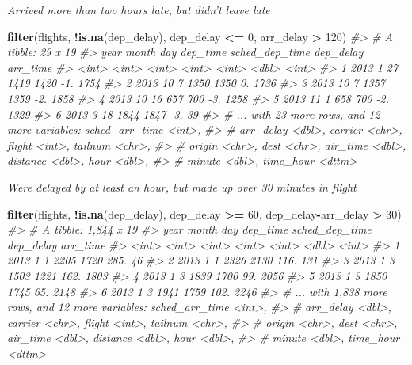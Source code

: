 \documentclass[]{book}
\newenvironment{Shaded}{\begin{snugshade}}{\end{snugshade}}
\newcommand{\CommentTok}[1]{\textcolor[rgb]{0.56,0.35,0.01}{\textit{#1}}}
\newcommand{\DecValTok}[1]{\textcolor[rgb]{0.00,0.00,0.81}{#1}}
\newcommand{\KeywordTok}[1]{\textcolor[rgb]{0.13,0.29,0.53}{\textbf{#1}}}
\newcommand{\NormalTok}[1]{#1}
\newcommand{\OperatorTok}[1]{\textcolor[rgb]{0.81,0.36,0.00}{\textbf{#1}}}
\newcommand{\StringTok}[1]{\textcolor[rgb]{0.31,0.60,0.02}{#1}}
\theoremstyle{definition}
\theoremstyle{definition}
\theoremstyle{definition}
\theoremstyle{remark}
\begin{document}
\emph{Arrived more than two hours late, but didn't leave late}

\begin{Shaded}
\begin{Highlighting}[]
\KeywordTok{filter}\NormalTok{(flights, }\OperatorTok{!}\KeywordTok{is.na}\NormalTok{(dep_delay), dep_delay }\OperatorTok{<=}\StringTok{ }\DecValTok{0}\NormalTok{, arr_delay }\OperatorTok{>}\StringTok{ }\DecValTok{120}\NormalTok{)}
\CommentTok{#> # A tibble: 29 x 19}
\CommentTok{#>    year month   day dep_time sched_dep_time dep_delay arr_time}
\CommentTok{#>   <int> <int> <int>    <int>          <int>     <dbl>    <int>}
\CommentTok{#> 1  2013     1    27     1419           1420       -1.     1754}
\CommentTok{#> 2  2013    10     7     1350           1350        0.     1736}
\CommentTok{#> 3  2013    10     7     1357           1359       -2.     1858}
\CommentTok{#> 4  2013    10    16      657            700       -3.     1258}
\CommentTok{#> 5  2013    11     1      658            700       -2.     1329}
\CommentTok{#> 6  2013     3    18     1844           1847       -3.       39}
\CommentTok{#> # ... with 23 more rows, and 12 more variables: sched_arr_time <int>,}
\CommentTok{#> #   arr_delay <dbl>, carrier <chr>, flight <int>, tailnum <chr>,}
\CommentTok{#> #   origin <chr>, dest <chr>, air_time <dbl>, distance <dbl>, hour <dbl>,}
\CommentTok{#> #   minute <dbl>, time_hour <dttm>}
\end{Highlighting}
\end{Shaded}

\emph{Were delayed by at least an hour, but made up over 30 minutes in
flight}

\begin{Shaded}
\begin{Highlighting}[]
\KeywordTok{filter}\NormalTok{(flights, }\OperatorTok{!}\KeywordTok{is.na}\NormalTok{(dep_delay), dep_delay }\OperatorTok{>=}\StringTok{ }\DecValTok{60}\NormalTok{, dep_delay}\OperatorTok{-}\NormalTok{arr_delay }\OperatorTok{>}\StringTok{ }\DecValTok{30}\NormalTok{)}
\CommentTok{#> # A tibble: 1,844 x 19}
\CommentTok{#>    year month   day dep_time sched_dep_time dep_delay arr_time}
\CommentTok{#>   <int> <int> <int>    <int>          <int>     <dbl>    <int>}
\CommentTok{#> 1  2013     1     1     2205           1720      285.       46}
\CommentTok{#> 2  2013     1     1     2326           2130      116.      131}
\CommentTok{#> 3  2013     1     3     1503           1221      162.     1803}
\CommentTok{#> 4  2013     1     3     1839           1700       99.     2056}
\CommentTok{#> 5  2013     1     3     1850           1745       65.     2148}
\CommentTok{#> 6  2013     1     3     1941           1759      102.     2246}
\CommentTok{#> # ... with 1,838 more rows, and 12 more variables: sched_arr_time <int>,}
\CommentTok{#> #   arr_delay <dbl>, carrier <chr>, flight <int>, tailnum <chr>,}
\CommentTok{#> #   origin <chr>, dest <chr>, air_time <dbl>, distance <dbl>, hour <dbl>,}
\CommentTok{#> #   minute <dbl>, time_hour <dttm>}
\end{Highlighting}
\end{Shaded}
\end{document}
